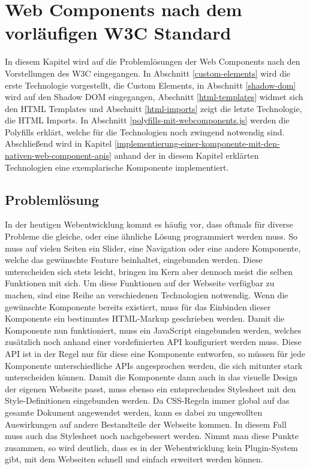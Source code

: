 \chapter{Web Components nach dem vorläufigen W3C Standard}\label{web-components-nach-w3c}

In diesem Kapitel wird auf die Problemlösungen der Web Components nach den Vorstellungen des \ac{W3C} eingegangen. In Abschnitt \ref{custom-elements} wird die erste Technologie vorgestellt, die Custom Elements, in Abschnitt \ref{shadow-dom} wird auf den Shadow \ac{DOM} eingegangen, Abschnitt \ref{html-templates} widmet sich den \ac{HTML} Templates und Abschnitt \ref{html-imports} zeigt die letzte Technologie, die \ac{HTML} Imports. In Abschnitt \ref{polyfills-mit-webcomponents.js} werden die Polyfills erklärt, welche für die Technologien noch zwingend notwendig sind. Abschließend wird in Kapitel \ref{implementierung-einer-komponente-mit-den-nativen-web-component-apis} anhand der in diesem Kapitel erklärten Technologien eine exemplarische Komponente implementiert.


\section{Problemlösung}\label{problemloesung}

In der heutigen Webentwicklung kommt es häufig vor, dass oftmals für diverse Probleme die gleiche, oder eine ähnliche Lösung programmiert werden muss. So muss auf vielen Seiten ein Slider, eine Navigation oder eine andere Komponente, welche das gewünschte Feature beinhaltet, eingebunden werden. Diese unterscheiden sich stets leicht, bringen im Kern aber dennoch meist die selben Funktionen mit sich. Um diese Funktionen auf der Webseite verfügbar zu machen, sind eine Reihe an verschiedenen Technologien notwendig. Wenn die gewünschte Komponente bereits existiert, muss für das Einbinden dieser Komponente ein bestimmtes \ac{HTML}-Markup geschrieben werden. Damit die Komponente nun funktioniert, muss ein JavaScript eingebunden werden, welches zusätzlich noch anhand einer vordefinierten \ac{API} konfiguriert werden muss. Diese \ac{API} ist in der Regel nur für diese eine Komponente entworfen, so müssen für jede Komponente unterschiedliche \ac{API}s angesprochen werden, die sich mitunter stark unterscheiden können. Damit die Komponente dann auch in das visuelle Design der eigenen Webseite passt, muss ebenso ein entsprechendes Stylesheet mit den Style-Definitionen eingebunden werden. Da \ac{CSS}-Regeln immer global auf das gesamte Dokument angewendet werden, kann es dabei zu ungewollten Auswirkungen auf andere Bestandteile der Webseite kommen. In diesem Fall muss auch das Stylesheet noch nachgebessert werden. Nimmt man diese Punkte zusammen, so wird deutlich, dass es in der Webentwicklung kein Plugin-System gibt, mit dem Webseiten schnell und einfach erweitert werden können.

